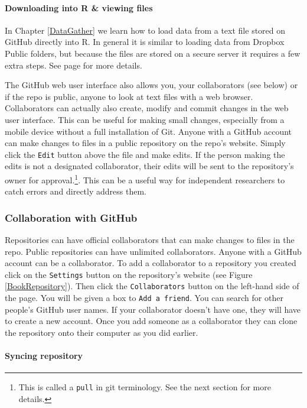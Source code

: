 \paragraph{Downloading into R \& viewing files}

In Chapter \ref{DataGather} we learn how to load data from a text file stored on GitHub directly into R. In general it is similar to loading data from Dropbox Public folders, but because the files are stored on a secure server it requires a few extra steps. See page \pageref{SecureDataDownload} for more details.

The GitHub web user interface also allows you, your collaborators (see below) or if the repo is public, anyone to look at text files with a web browser. Collaborators can actually also create, modify and commit changes in the web user interface. This can be useful for making small changes, especially from a mobile device without a full installation of Git. Anyone with a GitHub account can make changes to files in a public repository on the repo's website. Simply click the \texttt{Edit} button above the file and make edits. If the person making the edits is not a designated collaborator, their edits will be sent to the repository's owner for approval.\footnote{This is called a \texttt{pull} in git terminology. See the next section for more details.}. This can be a useful way for independent researchers to catch errors and directly address them.

\subsubsection{Collaboration with GitHub}

Repositories can have official collaborators that can make changes to files in the repo. Public repositories can have unlimited collaborators. Anyone with a GitHub account can be a collaborator. To add a collaborator to a repository you created click on the \texttt{Settings} button on the repository's website (see Figure \ref{BookRepository}). Then click the \texttt{Collaborators} button on the left-hand side of the page. You will be given a box to \texttt{Add a friend}. You can search for other people's GitHub user names. If your collaborator doesn't have one, they will have to create a new account. Once you add someone as a collaborator they can clone the repository onto their computer as you did earlier.

\paragraph{Syncing repository}

